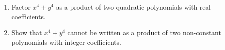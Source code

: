 \begin{enumerate}
\item[(a)] Factor $x^4+y^4$ as a product of two quadratic polynomials with real coefficients.
\item[(b)] Show that $x^4+y^4$ cannot be written as a product of two non-constant polynomials with integer coefficients.
\end{enumerate}
